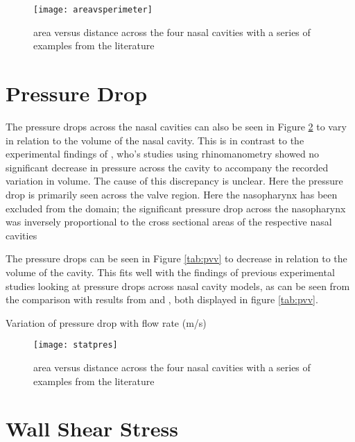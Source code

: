 \begin{figure} \label{fig:arpar}
  \texttt{[image: areavsperimeter]}
  \caption{area versus distance across the four nasal cavities with a series of examples from the literature}
\end{figure}
\section{Pressure Drop}

The pressure drops across the nasal cavities can also be seen in Figure \ref{fig:stpr} to vary in relation to the volume of the nasal cavity. This is in contrast to the experimental findings of \cite{Lindemann2008, Edelstein1996, WhanKim2007}, who’s studies using rhinomanometry showed no significant decrease in pressure across the cavity to accompany the recorded variation in volume. The cause of this discrepancy is unclear. Here the pressure drop is primarily seen across the valve region. Here the nasopharynx has been excluded from the domain; the significant pressure drop across the nasopharynx was inversely proportional to the cross sectional areas of the respective nasal cavities

The pressure drops can be seen in Figure \ref{tab:pvv} to decrease in relation to the volume of the cavity. This fits well with the findings of previous experimental studies looking at pressure drops across nasal cavity models, as can be seen from the comparison with results from \cite{Garcia2007} and \cite{Kelly2004}, both displayed in figure \ref{tab:pvv}.

  \begin{table} \label{tab:pvv}
    \centering

  \caption{Variation of pressure drop with flow rate (m/s)}
\end{table}

\begin{figure} \label{fig:stpr}
  \texttt{[image: statpres]}
  \caption{area versus distance across the four nasal cavities with a series of examples from the literature}
\end{figure}

\section{Wall Shear Stress}

